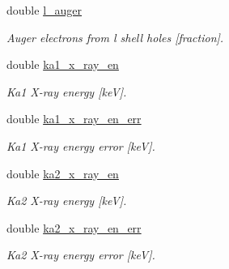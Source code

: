 \begin{DoxyCompactItemize}
\mbox{\label{structpyne_1_1atomic_ae119f4601b283d50b3b9b00276b99f94}} 
double \hyperlink{structpyne_1_1atomic_ae119f4601b283d50b3b9b00276b99f94}{l\+\_\+auger}
\begin{DoxyCompactList}\small\item\em Auger electrons from l shell holes \mbox{[}fraction\mbox{]}. \end{DoxyCompactList}\item 
\mbox{\label{structpyne_1_1atomic_a142290f90ae3beb3ff063f47b6c5e3d1}} 
double \hyperlink{structpyne_1_1atomic_a142290f90ae3beb3ff063f47b6c5e3d1}{ka1\+\_\+x\+\_\+ray\+\_\+en}
\begin{DoxyCompactList}\small\item\em Ka1 X-\/ray energy \mbox{[}keV\mbox{]}. \end{DoxyCompactList}\item 
\mbox{\label{structpyne_1_1atomic_a94c8b5a6abbc5d6171f2f78d9c3d24ee}} 
double \hyperlink{structpyne_1_1atomic_a94c8b5a6abbc5d6171f2f78d9c3d24ee}{ka1\+\_\+x\+\_\+ray\+\_\+en\+\_\+err}
\begin{DoxyCompactList}\small\item\em Ka1 X-\/ray energy error \mbox{[}keV\mbox{]}. \end{DoxyCompactList}\item 
\mbox{\label{structpyne_1_1atomic_a80a5ab6421b70b468a48b4e90b1ee2cc}} 
double \hyperlink{structpyne_1_1atomic_a80a5ab6421b70b468a48b4e90b1ee2cc}{ka2\+\_\+x\+\_\+ray\+\_\+en}
\begin{DoxyCompactList}\small\item\em Ka2 X-\/ray energy \mbox{[}keV\mbox{]}. \end{DoxyCompactList}\item 
\mbox{\label{structpyne_1_1atomic_aa9b892536e99c583051225e068af380b}} 
double \hyperlink{structpyne_1_1atomic_aa9b892536e99c583051225e068af380b}{ka2\+\_\+x\+\_\+ray\+\_\+en\+\_\+err}
\begin{DoxyCompactList}\small\item\em Ka2 X-\/ray energy error \mbox{[}keV\mbox{]}. \end{DoxyCompactList}\item 
\mbox{\label{structpyne_1_1atomic_aa93013778d65dc071c27564449e351de}} 

\end{DoxyCompactItemize}
